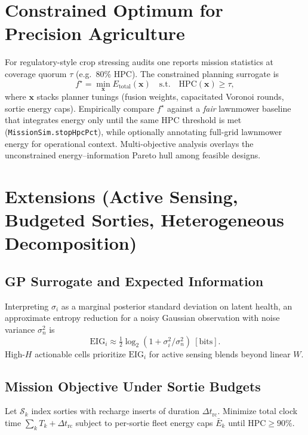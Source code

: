 \documentclass[conference]{IEEEtran}
\begin{document}
\section{Constrained Optimum for Precision Agriculture}
For regulatory-style crop stressing audits one reports mission statistics at coverage quorum $\tau$ (e.g.\ $80\%$ HPC). The constrained planning surrogate is
\begin{equation}
f^\star = \min_{\mathbf{x}} E_{\mathrm{total}}(\mathbf{x})\quad\text{s.t.}\quad \mathrm{HPC}(\mathbf{x})\geq \tau,
\end{equation}
where $\mathbf{x}$ stacks planner tunings (fusion weights, capacitated Voronoi rounds, sortie energy caps). Empirically compare $f^\star$ against a \emph{fair} lawnmower baseline that integrates energy only until the same $\mathrm{HPC}$ threshold is met (\texttt{MissionSim.stopHpcPct}), while optionally annotating full-grid lawnmower energy for operational context. Multi-objective analysis overlays the unconstrained energy--information Pareto hull among feasible designs.

\section{Extensions (Active Sensing, Budgeted Sorties, Heterogeneous Decomposition)}
\subsection{GP Surrogate and Expected Information}
Interpreting $\sigma_i$ as a marginal posterior standard deviation on latent health, an approximate entropy reduction for a noisy Gaussian observation with noise variance $\sigma_n^2$ is
\begin{equation}
\mathrm{EIG}_i \approx \tfrac{1}{2}\log_2\!\left(1+\sigma_i^2/\sigma_n^2\right)\ [\mathrm{bits}].
\end{equation}
High-$H$ actionable cells prioritize $\mathrm{EIG}_i$ for active sensing blends beyond linear $W$.

\subsection{Mission Objective Under Sortie Budgets}
Let $\mathcal{S}_k$ index sorties with recharge inserts of duration $\Delta t_{\mathrm{rc}}$. Minimize total clock time $\sum_k T_k + \Delta t_{\mathrm{rc}}$ subject to per-sortie fleet energy caps $\bar{E}_k$ until $\mathrm{HPC}\ge 90\%$.
\end{document}
